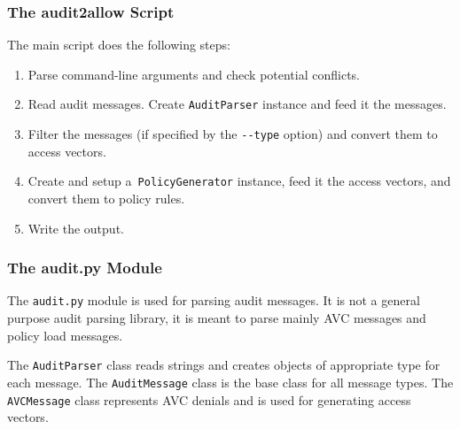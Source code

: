 \subsubsection{The audit2allow Script}

The main script does the following steps:
\begin{enumerate}
    \item Parse command-line arguments and check potential conflicts.
    \item Read audit messages. Create \texttt{AuditParser} instance and feed it
        the messages.
    \item Filter the messages (if specified by the \texttt{-{}-type} option) and
        convert them to access vectors.
    \item Create and setup a~\texttt{PolicyGenerator} instance, feed it the
        access vectors, and convert them to policy rules.
    \item Write the output.
\end{enumerate}

\subsubsection{The audit.py Module}

The \texttt{audit.py} module is used for parsing audit messages. It is not a
general purpose audit parsing library, it is meant to parse mainly AVC messages
and policy load messages.

The \texttt{AuditParser} class reads strings and creates objects of appropriate
type for each message. The \texttt{AuditMessage} class is the base class for all
message types. The \texttt{AVCMessage} class represents AVC denials and is used
for generating access vectors.

